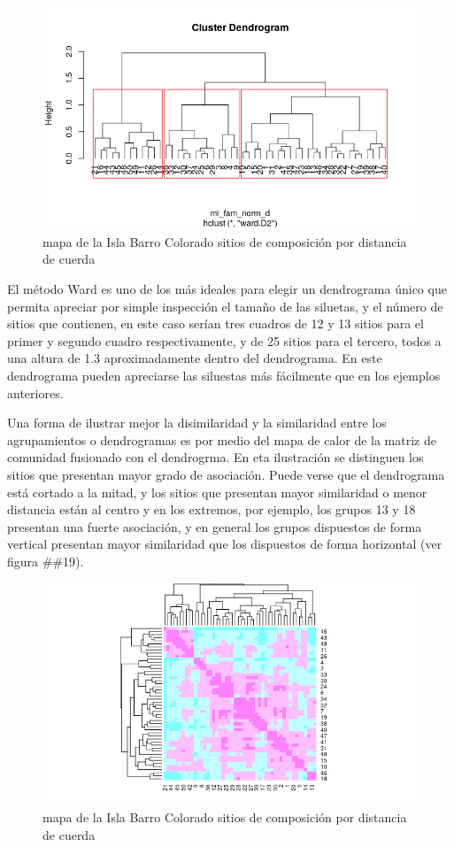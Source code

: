 \documentclass[11pt,]{article}
\begin{document}
\begin{figure}
\centering
\includegraphics[width=1.00000\textwidth]{agrupamiento_dendrograma.png}
\caption{mapa de la Isla Barro Colorado sitios de composición por
distancia de cuerda \label{fig:bci_map}}
\end{figure}

El método Ward es uno de los más ideales para elegir un dendrograma
único que permita apreciar por simple inspección el tamaño de las
siluetas, y el número de sitios que contienen, en este caso serían tres
cuadros de 12 y 13 sitios para el primer y segundo cuadro
respectivamente, y de 25 sitios para el tercero, todos a una altura de
1.3 aproximadamente dentro del dendrograma. En este dendrograma pueden
apreciarse las siluestas más fácilmente que en los ejemplos anteriores.

Una forma de ilustrar mejor la disimilaridad y la similaridad entre los
agrupamientos o dendrogramas es por medio del mapa de calor de la matriz
de comunidad fusionado con el dendrogrma. En eta ilustración se
distinguen los sitios que presentan mayor grado de asociación. Puede
verse que el dendrograma está cortado a la mitad, y los sitios que
presentan mayor similaridad o menor distancia están al centro y en los
extremos, por ejemplo, los grupos 13 y 18 presentan una fuerte
asociación, y en general los grupos dispuestos de forma vertical
presentan mayor similaridad que los dispuestos de forma horizontal (ver
figura \#\#19).

\begin{figure}
\centering
\includegraphics[width=1.00000\textwidth]{comparacion_dendrograma_mapa_calor.png}
\caption{mapa de la Isla Barro Colorado sitios de composición por
distancia de cuerda \label{fig:bci_map}}
\end{figure}
\end{document}
